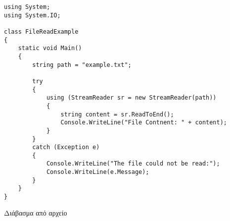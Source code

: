 \begin{listing}[H]
\begin{verbatim}
using System;
using System.IO;

class FileReadExample
{
    static void Main()
    {
        string path = "example.txt";

        try
        {
            using (StreamReader sr = new StreamReader(path))
            {
                string content = sr.ReadToEnd();
                Console.WriteLine("File Contnent: " + content);
            }
        } 
        catch (Exception e)
        {
            Console.WriteLine("The file could not be read:");
            Console.WriteLine(e.Message);
        }
    }
}
\end{verbatim}
\caption{Διάβασμα από αρχείο}
\label{ReadFile}
\end{listing}